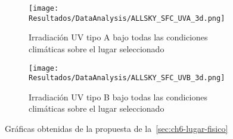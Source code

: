 	\begin{figure}[H]\ContinuedFloat
		\begin{subfigure}[t]{0.45\linewidth}
			\centering
			\texttt{[image: Resultados/DataAnalysis/ALLSKY\_SFC\_UVA\_3d.png]}
			\caption{Irradiación UV tipo A bajo todas las condiciones climáticas sobre el lugar seleccionado}
			\label{fig:ALLSKY_SFC_UVA_3d}
		\end{subfigure}
		\hfill
		\begin{subfigure}[t]{0.45\linewidth}
			\centering
			\texttt{[image: Resultados/DataAnalysis/ALLSKY\_SFC\_UVB\_3d.png]}
			\caption{Irradiación UV tipo B bajo todas las condiciones climáticas sobre el lugar seleccionado}
			\label{fig:ALLSKY_SFC_UVB_3d}
		\end{subfigure}
		\caption{Gráficas obtenidas de la propuesta de la~\cref{sec:ch6-lugar-fisico}}
	\end{figure}